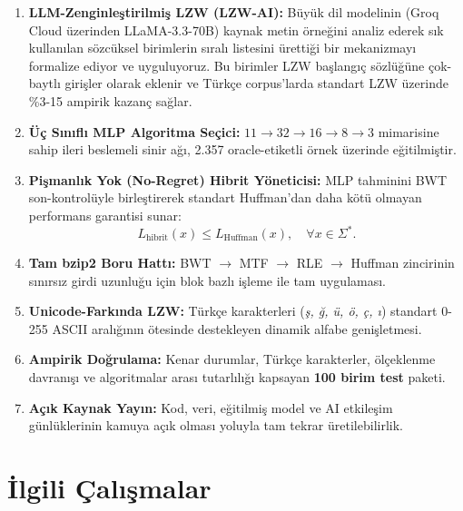 \documentclass[conference]{IEEEtran}
\begin{document}
\begin{enumerate}
\item \textbf{LLM-Zenginleştirilmiş LZW (LZW-AI):} Büyük dil modelinin (Groq Cloud üzerinden LLaMA-3.3-70B) kaynak metin örneğini analiz ederek sık kullanılan sözcüksel birimlerin sıralı listesini ürettiği bir mekanizmayı formalize ediyor ve uyguluyoruz. Bu birimler LZW başlangıç sözlüğüne çok-baytlı girişler olarak eklenir ve Türkçe corpus'larda standart LZW üzerinde \%3-15 ampirik kazanç sağlar.

\item \textbf{Üç Sınıflı MLP Algoritma Seçici:} \(11 \to 32 \to 16 \to 8 \to 3\) mimarisine sahip ileri beslemeli sinir ağı, 2.357 oracle-etiketli örnek üzerinde eğitilmiştir.

\item \textbf{Pişmanlık Yok (No-Regret) Hibrit Yöneticisi:} MLP tahminini BWT son-kontrolüyle birleştirerek standart Huffman'dan daha kötü olmayan performans garantisi sunar:
\begin{equation}
L_{\text{hibrit}}(x) \leq L_{\text{Huffman}}(x), \quad \forall x \in \Sigma^*.
\label{eq:noregret}
\end{equation}

\item \textbf{Tam bzip2 Boru Hattı:} BWT \(\to\) MTF \cite{bentley1986} \(\to\) RLE \(\to\) Huffman zincirinin sınırsız girdi uzunluğu için blok bazlı işleme ile tam uygulaması.

\item \textbf{Unicode-Farkında LZW:} Türkçe karakterleri (\textit{ş, ğ, ü, ö, ç, ı}) standart 0-255 ASCII aralığının ötesinde destekleyen dinamik alfabe genişletmesi.

\item \textbf{Ampirik Doğrulama:} Kenar durumlar, Türkçe karakterler, ölçeklenme davranışı ve algoritmalar arası tutarlılığı kapsayan \textbf{100 birim test} paketi.

\item \textbf{Açık Kaynak Yayın:} Kod, veri, eğitilmiş model ve AI etkileşim günlüklerinin kamuya açık olması yoluyla tam tekrar üretilebilirlik.
\end{enumerate}

\section{İlgili Çalışmalar}
\end{document}
